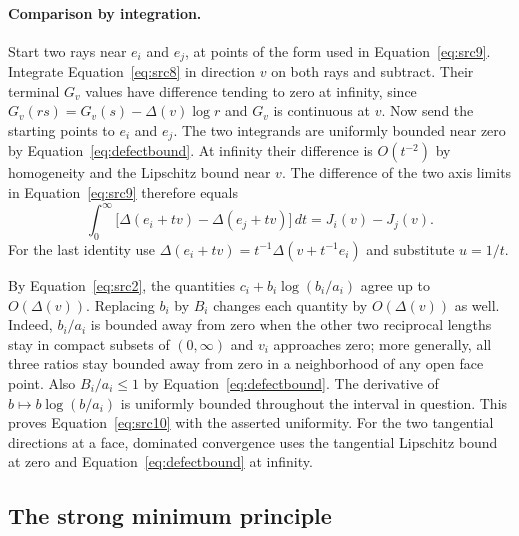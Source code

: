 \paragraph{Comparison by integration.}
Start two rays near $e_i$ and $e_j$, at points of the form used in
Equation~\eqref{eq:src9}. Integrate Equation~\eqref{eq:src8} in
direction $v$ on both rays and subtract. Their terminal $G_v$ values
have difference tending to zero at infinity, since
$G_v(rs)=G_v(s)-\Delta(v)\log r$ and $G_v$ is continuous at $v$.
Now send the starting points to $e_i$ and $e_j$. The two integrands
are uniformly bounded near zero by Equation~\eqref{eq:defectbound}.
At infinity their difference is $O(t^{-2})$ by homogeneity and the
Lipschitz bound near $v$. The difference of the two axis limits in
Equation~\eqref{eq:src9} therefore equals
\[
 \int_0^\infty\big[\Delta(e_i+tv)-\Delta(e_j+tv)\big]\,dt
    =J_i(v)-J_j(v).
\]
For the last identity use $\Delta(e_i+tv)=t^{-1}\Delta(v+t^{-1}e_i)$
and substitute $u=1/t$.

By Equation~\eqref{eq:src2}, the quantities $c_i+b_i\log(b_i/a_i)$
agree up to $O(\Delta(v))$. Replacing $b_i$ by $B_i$ changes each
quantity by $O(\Delta(v))$ as well. Indeed, $b_i/a_i$ is bounded
away from zero when the other two reciprocal lengths stay in compact
subsets of $(0,\infty)$ and $v_i$ approaches zero; more generally,
all three ratios stay bounded away from zero in a neighborhood of any
open face point. Also $B_i/a_i\le1$ by Equation~\eqref{eq:defectbound}.
The derivative of $b\mapsto b\log(b/a_i)$ is uniformly bounded
throughout the interval in question. This proves Equation~\eqref{eq:src10}
with the asserted uniformity. For the two tangential directions
at a face, dominated convergence uses the tangential Lipschitz bound
at zero and Equation~\eqref{eq:defectbound} at infinity.

\subsection{The strong minimum principle}

